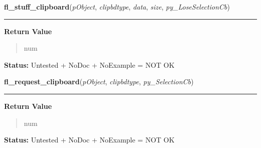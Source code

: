     \label{xformslib:library:fl_stuff_clipboard}

    \vspace{0.5ex}

\hspace{.8\funcindent}\begin{boxedminipage}{\funcwidth}

    \raggedright \textbf{fl\_stuff\_clipboard}(\textit{pObject}, \textit{clipbdtype}, \textit{data}, \textit{size}, \textit{py\_LoseSelectionCb})

    \vspace{-1.5ex}

    \rule{\textwidth}{0.5\fboxrule}
\setlength{\parskip}{2ex}
\setlength{\parskip}{1ex}
      \textbf{Return Value}
    \vspace{-1ex}

      \begin{quote}
      num

      \end{quote}

\textbf{Status:} Untested + NoDoc + NoExample = NOT OK



    \end{boxedminipage}

    \label{xformslib:library:fl_request_clipboard}

    \vspace{0.5ex}

\hspace{.8\funcindent}\begin{boxedminipage}{\funcwidth}

    \raggedright \textbf{fl\_request\_clipboard}(\textit{pObject}, \textit{clipbdtype}, \textit{py\_SelectionCb})

    \vspace{-1.5ex}

    \rule{\textwidth}{0.5\fboxrule}
\setlength{\parskip}{2ex}
\setlength{\parskip}{1ex}
      \textbf{Return Value}
    \vspace{-1ex}

      \begin{quote}
      num

      \end{quote}

\textbf{Status:} Untested + NoDoc + NoExample = NOT OK



    \end{boxedminipage}

